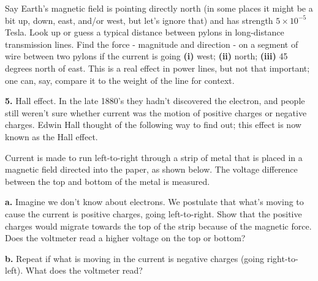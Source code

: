 \documentclass[12pt]{article}
\begin{document}
Say Earth's magnetic field is pointing directly north (in some places it might be a bit up, down, east, and/or west, but let's ignore that) and has strength $5 \times 10^{-5}$ Tesla. Look up or guess a typical distance between pylons in long-distance transmission lines. Find the force - magnitude and direction - on a segment of wire between two pylons if the current is going \textbf{(i)} west; \textbf{(ii)} north; \textbf{(iii)} 45 degrees north of east. This is a real effect in power lines, but not that important; one can, say, compare it to the weight of the line for context.

\bigskip
\bigskip

\textbf{5.} Hall effect. In the late 1880's they hadn't discovered the electron, and people still weren't sure whether current was the motion of positive charges or negative charges. Edwin Hall thought of the following way to find out; this effect is now known as the Hall effect.

Current is made to run left-to-right through a strip of metal that is placed in a magnetic field directed into the paper, as shown below. The voltage difference between the top and bottom of the metal is measured. 

\vspace{1.7in}

\textbf{a.} Imagine we don't know about electrons. We postulate that what's moving to cause the current is positive charges, going left-to-right. Show that the positive charges would migrate towards the top of the strip because of the magnetic force. Does the voltmeter read a higher voltage on the top or bottom?

\textbf{b.} Repeat if what is moving in the current is negative charges (going right-to-left). What does the voltmeter read?
\end{document}
